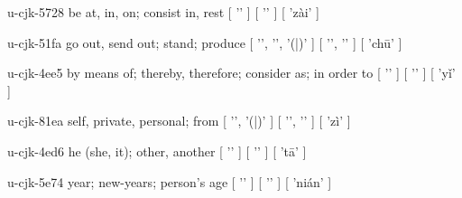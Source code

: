 \begin{multicols}{2}
\cjkgGlue{} u-cjk-5728  be at, in, on; consist in, rest  [ '\cjkgGlue{}' ]  [ '\cjkgGlue{}' ]  [ 'zài' ] 

\cjkgGlue{} u-cjk-51fa  go out, send out; stand; produce  [ '\cjkgGlue{}', '\cjkgGlue{}', '\cjkgGlue{}(\cjkgGlue{}|\cjkgGlue{})' ]  [ '\cjkgGlue{}', '\cjkgGlue{}' ]  [ 'ch{\mktsRsgFb{}ū}' ] 

\cjkgGlue{} u-cjk-4ee5  by means of; thereby, therefore; consider as; in order to  [ '\cjkgGlue{}' ]  [ '\cjkgGlue{}' ]  [ 'y{\mktsRsgFb{}ǐ}' ] 

\cjkgGlue{} u-cjk-81ea  self, private, personal; from  [ '\cjkgGlue{}', '\cjkgGlue{}(\cjkgGlue{}|\cjkgGlue{})' ]  [ '\cjkgGlue{}', '\cjkgGlue{}' ]  [ 'zì' ] 

\cjkgGlue{} u-cjk-4ed6  he (she, it); other, another  [ '\cjkgGlue{}' ]  [ '\cjkgGlue{}' ]  [ 't{\mktsRsgFb{}ā}' ] 

\cjkgGlue{} u-cjk-5e74  year; new-years; person's age  [ '\cjkgGlue{}' ]  [ '\cjkgGlue{}' ]  [ 'nián' ] 


\end{multicols}
